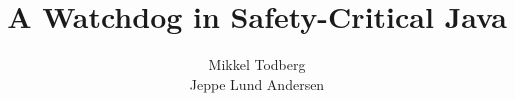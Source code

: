 



	\title{A Watchdog in Safety-Critical Java}
	\author{Mikkel Todberg \\ Jeppe Lund Andersen}
	\maketitle

	\tableofcontents
	\cleardoublepage

	\pagestyle{plain}

	
	\appendix
	

